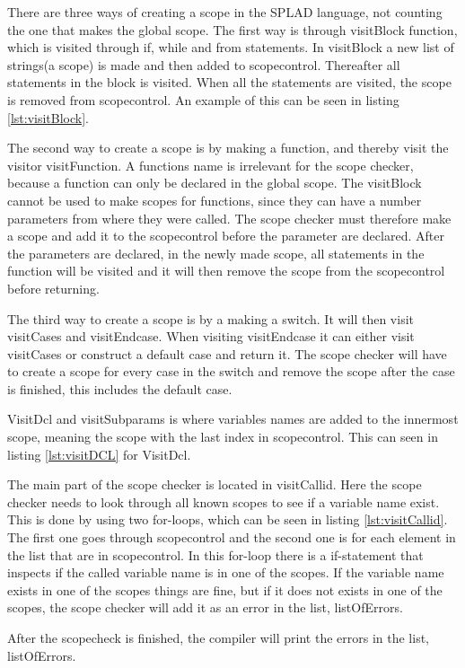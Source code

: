 There are three ways of creating a scope in the SPLAD language, not counting the one that makes the global scope. The first way is through visitBlock function, which is visited through if, while and from statements. In visitBlock a new list of strings(a scope) is made and then added to scopecontrol. Thereafter all statements in the block is visited. When all the statements are visited, the scope is removed from scopecontrol. An example of this can be seen in listing \ref{lst:visitBlock}.


The second way to create a scope is by making a function, and thereby visit the visitor visitFunction. A functions name is irrelevant for the scope checker, because a function can only be declared in the global scope. The visitBlock cannot be used to make scopes for functions, since they can have a number parameters from where they were called. The scope checker must therefore make a scope and add it to the scopecontrol before the parameter are declared. After the parameters are declared, in the newly made scope, all statements in the function will be visited and it will then remove the scope from the scopecontrol before returning.

The third way to create a scope is by a making a switch. It will then visit visitCases and visitEndcase. When visiting visitEndcase it can either visit visitCases or construct a default case and return it. The scope checker will have to create a scope for every case in the switch and remove the scope after the case is finished, this includes the default case.

VisitDcl and visitSubparams is where variables names are added to the innermost scope, meaning the scope with the last index in scopecontrol. This can seen in listing \ref{lst:visitDCL} for VisitDcl.


The main part of the scope checker is located in visitCallid. Here the scope checker needs to look through all known scopes to see if a variable name exist. This is done by using two for-loops, which can be seen in listing \ref{lst:visitCallid}. The first one goes through scopecontrol and the second one is for each element in the list that are in scopecontrol. In this for-loop there is a if-statement that inspects if the called variable name is in one of the scopes. If the variable name exists in one of the scopes things are fine, but if it does not exists in one of the scopes, the scope checker will add it as an error in the list, listOfErrors.


After the scopecheck is finished, the compiler will print the errors in the list, listOfErrors.
